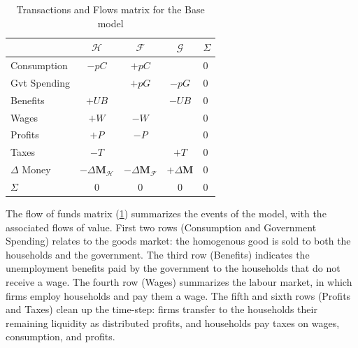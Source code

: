 \begin{table}
    \centering
    \begin{tabular}{l|ccc|l}

                       & $\mathcal{H}$                   & $\mathcal{F} $                  & $\mathcal{G}$       & $\Sigma$ \\
        \midrule
        Consumption    & $-p C$                          & $+p C$                          &                     & 0        \\
        Gvt Spending   &                                 & $+p G$                          & $-p G$              & 0        \\
        Benefits       & $+UB$                           &                                 & $-UB$               & 0        \\
        Wages          & $+W$                            & $-W$                            &                     & 0        \\
        Profits        & $+P$                            & $-P$                            &                     & 0        \\
        Taxes          &
        $-T$           &                                 & $+T$                            & 0                              \\
        \midrule
        $\Delta$ Money & $-\Delta\mathbf{M}_\mathcal{H}$ & $-\Delta\mathbf{M}_\mathcal{F}$ & $+\Delta\mathbf{M}$ & 0        \\
        \midrule
        $\Sigma$       & 0                               & 0                               & 0                   & 0        \\
    \end{tabular}
    \caption{Transactions and Flows matrix for the Base model}
    \label{tab:fof}
\end{table}

The flow of funds matrix (\ref{tab:fof}) summarizes the events of the model, with the associated flows of value.
First two rows (Consumption and Government Spending) relates to the goods market: the homogenous good is sold to both the households and the government.
The third row (Benefits) indicates the unemployment benefits paid by the government to the households that do not receive a wage.
The fourth row (Wages) summarizes the labour market, in which firms employ households and pay them a wage.
The fifth and sixth rows (Profits and Taxes) clean up the time-step: firms transfer to the households their remaining liquidity as distributed profits, and households pay taxes on wages, consumption, and profits.

